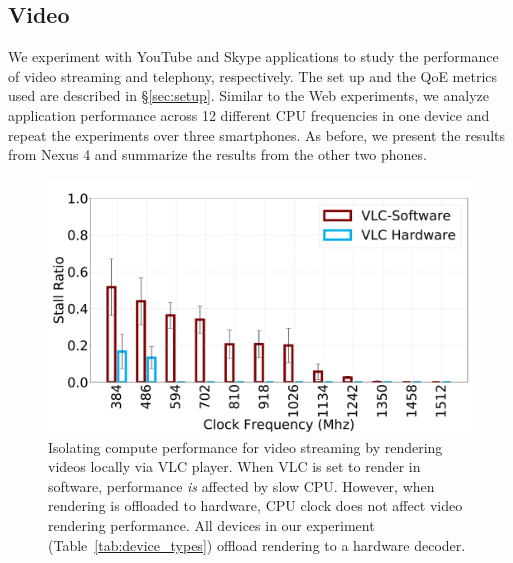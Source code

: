 
\subsection{Video} 
\label{label:video}

We experiment with YouTube and Skype applications to study the performance of video streaming and telephony, respectively. The set up and the QoE metrics used are described in \S\ref{sec:setup}. Similar to the Web experiments, we analyze application performance across 12 different CPU frequencies in one device and repeat the experiments over three smartphones. As before, we present the results from Nexus 4 and summarize the results from the other two phones.






\begin{figure}[t]
  \centering
  \includegraphics[width=0.8\linewidth]{sections/device-work/vlc-fps}
   \vspace{-0.1in}
     \caption{Isolating compute performance for video streaming by rendering videos locally via VLC player. When VLC is set to render in software, performance {\em is} affected by slow CPU. However, when  rendering is offloaded to hardware, CPU clock does not affect video rendering performance. All devices in our experiment (Table~\ref{tab:device_types}) offload rendering to a hardware decoder. }
   \vspace{-0.1in}
  \label{fig:vlc}
\end{figure}


